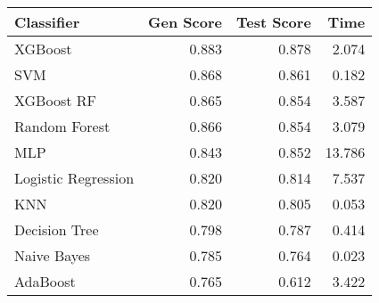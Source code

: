 \begin{tabular}{lrrr}
\toprule
Classifier & Gen Score & Test Score & Time \\
\midrule
XGBoost & 0.883 & 0.878 & 2.074 \\
SVM & 0.868 & 0.861 & 0.182 \\
XGBoost RF & 0.865 & 0.854 & 3.587 \\
Random Forest & 0.866 & 0.854 & 3.079 \\
MLP & 0.843 & 0.852 & 13.786 \\
Logistic Regression & 0.820 & 0.814 & 7.537 \\
KNN & 0.820 & 0.805 & 0.053 \\
Decision Tree & 0.798 & 0.787 & 0.414 \\
Naive Bayes & 0.785 & 0.764 & 0.023 \\
AdaBoost & 0.765 & 0.612 & 3.422 \\
\bottomrule
\end{tabular}
